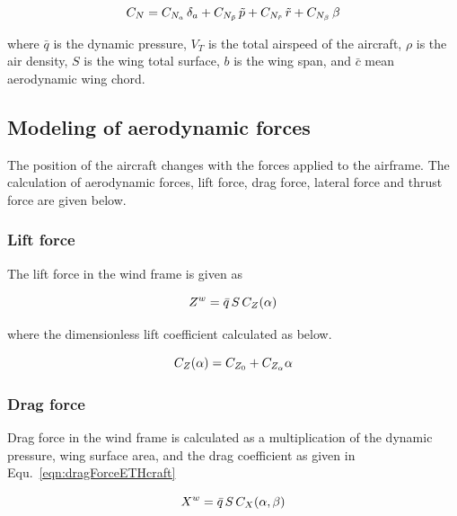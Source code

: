 \begin{equation}{\label{eqn:makoC_N}}
C_N= C_{N_{a}} \, \delta_{a} + C_{N_{\tilde{p}}} \, \tilde{p} + C_{N_{\tilde{r}}} \, \tilde{r} +  C_{N_\beta} \, \beta 
\end{equation}

where $\bar{q}$ is the dynamic pressure, $V_T$ is the total airspeed of the aircraft, $\rho$ is the air density, $S$ is the wing total surface, $b$ is the wing span, and $\bar{c}$ mean aerodynamic wing chord. 


\subsection{Modeling of aerodynamic forces}

The position of the aircraft changes with the forces applied to the airframe. The calculation of aerodynamic forces, lift force, drag force, lateral force and thrust force are given below.


\subsubsection{Lift force}

The lift force in the wind frame is given as 

\begin{equation}{\label{eqn:liftForce}}
Z^w = \bar{q} \, S \,  C_Z(\alpha)
\end{equation}

where the dimensionless lift coefficient calculated as below.

\begin{equation}{\label{eqn:liftCoef}}
C_Z(\alpha) = C_{Z_0} + C_{Z_{\alpha}} \alpha 
\end{equation}



\subsubsection{Drag force}

Drag force in the wind frame is calculated as a multiplication of the dynamic pressure, wing surface area, and the drag coefficient as given in Equ.~\ref{eqn:dragForceETHcraft}

\begin{equation}{\label{eqn:dragForceETHcraft}}
X^w = \bar{q} \, S \,  C_X(\alpha, \beta)
\end{equation}

